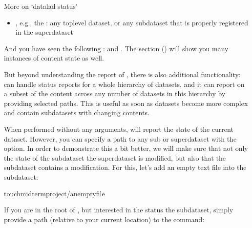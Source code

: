 \begin{findoutmore}[label={fom-status}, before title={\thetcbcounter\ }, float, check odd page=true]{More on ‘datalad status’}
\begin{itemize}
\item {} 
\sphinxAtStartPar
{}, e.g., the : any top\sphinxhyphen{}level dataset, or any subdataset
that is properly registered in the superdataset

\end{itemize}

\sphinxAtStartPar
And you have seen the following :  and .
The section {\hyperref[\detokenize{basics/101-136-filesystem:file-system}]{}} () will show you many instances of  content
state as well.

\sphinxAtStartPar
But beyond understanding the report of , there is also
additional functionality:
 can handle status reports for a whole hierarchy
of datasets, and it can report on a subset of the content across any number of
datasets in this hierarchy by providing selected paths. This is useful as soon
as datasets become more complex and contain subdatasets with changing contents.

\sphinxAtStartPar
When performed without any arguments,  will report
the state of the current dataset. However, you can specify a path to any
sub\sphinxhyphen{} or superdataset with the  option.
In order to demonstrate this a bit better, we will make sure that not only the
state of the subdataset  the superdataset is modified, but also that the
subdataset contains a modification. For this, let’s add an empty text file into
the  subdataset:

\begin{sphinxVerbatim}[commandchars=\\\{\}]
touchmidterm\PYGZus{}project/an\PYGZus{}empty\PYGZus{}file
\end{sphinxVerbatim}

\sphinxAtStartPar
If you are in the root of , but interested in the status
 the subdataset, simply provide a path (relative to your current location)
to the command:


\end{findoutmore}
